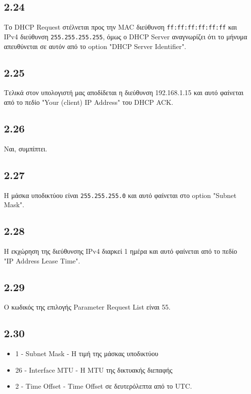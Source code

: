 		\subsection*{2.24}
			Το DHCP Request στέλνεται προς την MAC διεύθυνση \verb|ff:ff:ff:ff:ff:ff| και IPv4 διεύθυνση \verb|255.255.255.255|, όμως ο DHCP Server αναγνωρίζει ότι το μήνυμα απευθύνεται σε αυτόν από το option "DHCP Server Identifier".

		\subsection*{2.25}
			Τελικά στον υπολογιστή μας αποδίδεται η διεύθυνση 192.168.1.15 και αυτό φαίνεται από το πεδίο "Your (client) IP Address" του DHCP ACK.

		\subsection*{2.26}
			Ναι, συμπίπτει. 

		\subsection*{2.27}
			Η μάσκα υποδικτύου είναι \verb|255.255.255.0| και αυτό φαίνεται στο option "Subnet Mask".

		\subsection*{2.28}
			Η εκχώρηση της διεύθυνσης IPv4 διαρκεί 1 ημέρα και αυτό φαίνεται από το πεδίο "IP Address Lease Time".

		\subsection*{2.29}
			Ο κωδικός της επιλογής Parameter Request List είναι 55.

		\subsection*{2.30}
			\begin{itemize}
				\item 1 - Subnet Mask - Η τιμή της μάσκας υποδικτύου
				\item 26 - Interface MTU - Η MTU της δικτυακής διεπαφής
				\item 2 - Time Offset - Time Offset σε δευτερόλεπτα από το UTC.
			\end{itemize}

